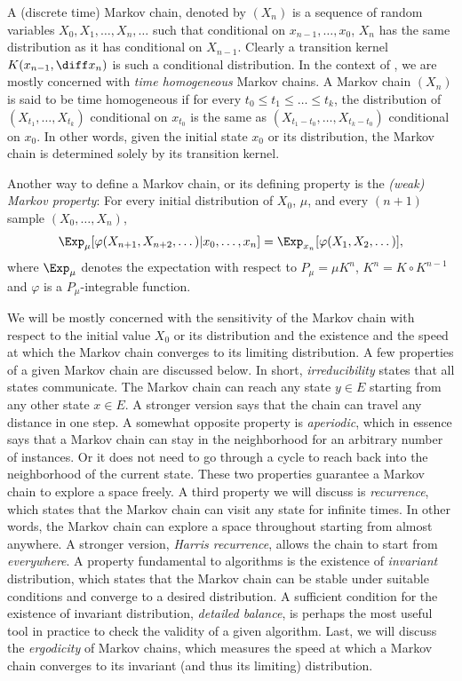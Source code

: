 A (discrete time) Markov chain, denoted by $(X_n)$ is a sequence of random
variables $X_0,X_1,\dots,X_n,\dots$ such that conditional on
$x_{n-1},\dots,x_0$, $X_n$ has the same distribution as it has conditional on
$X_{n-1}$. Clearly a transition kernel $K(x_{n-1},\diff x_n)$ is such a
conditional distribution. In the context of \mcmc, we are mostly concerned
with \emph{time homogeneous} Markov chains. A Markov chain $(X_n)$ is said to
be time homogeneous if for every $t_0\le t_1\le\dots\le t_k$, the distribution
of $(X_{t_1},\dots,X_{t_k})$ conditional on $x_{t_0}$ is the same as
$(X_{t_1-t_0},\dots,X_{t_k-t_0})$ conditional on $x_0$. In other words, given
the initial state $x_0$ or its distribution, the Markov chain is determined
solely by its transition kernel.

Another way to define a Markov chain, or its defining property is the
\emph{(weak) Markov property}: For every initial distribution of $X_0$, $\mu$,
and every $(n+1)$ sample $(X_0,\dots,X_n)$,
\begin{equation}
  \Exp_{\mu}[\varphi(X_{n+1},X_{n+2},\dots)|x_0,\dots,x_n] =
  \Exp_{x_n}[\varphi(X_1,X_2,\dots)],
\end{equation}
where $\Exp_{\mu}$ denotes the expectation with respect to $P_{\mu} = \mu
K^n$, $K^n = K\vysmwhtcircle K^{n-1}$ and $\varphi$ is a $P_{\mu}$-integrable
function.

We will be mostly concerned with the sensitivity of the Markov chain with
respect to the initial value $X_0$ or its distribution and the existence and
the speed at which the Markov chain converges to its limiting distribution. A
few properties of a given Markov chain are discussed below. In short,
\emph{irreducibility} states that all states communicate. The Markov chain can
reach any state $y\in E$ starting from any other state $x\in E$. A stronger
version says that the chain can travel any distance in one step. A somewhat
opposite property is \emph{aperiodic}, which in essence says that a Markov
chain can stay in the neighborhood for an arbitrary number of instances. Or it
does not need to go through a cycle to reach back into the neighborhood of the
current state. These two properties guarantee a Markov chain to explore a
space freely. A third property we will discuss is \emph{recurrence}, which
states that the Markov chain can visit any state for infinite times. In other
words, the Markov chain can explore a space throughout starting from almost
anywhere. A stronger version, \emph{Harris recurrence}, allows the chain to
start from \emph{everywhere}. A property fundamental to \mcmc algorithms is
the existence of \emph{invariant} distribution, which states that the Markov
chain can be stable under suitable conditions and converge to a desired
distribution. A sufficient condition for the existence of invariant
distribution, \emph{detailed balance}, is perhaps the most useful tool in
practice to check the validity of a given algorithm. Last, we will discuss the
\emph{ergodicity} of Markov chains, which measures the speed at which a Markov
chain converges to its invariant (and thus its limiting) distribution.

